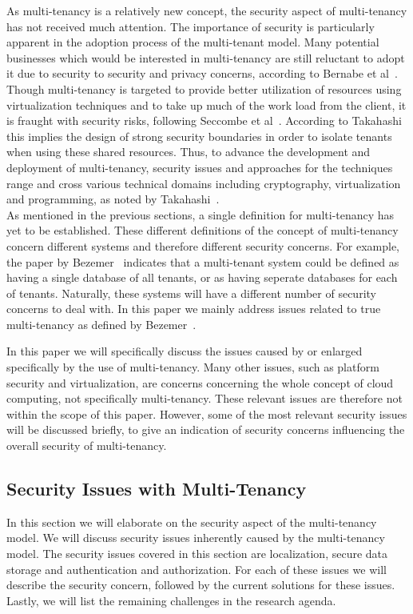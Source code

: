 As multi-tenancy is a relatively new concept, the security aspect of multi-tenancy has not received much attention. The importance of security is particularly apparent in the adoption process of the multi-tenant model. 
Many potential businesses which would be interested in multi-tenancy are still reluctant to adopt it due to security to security and privacy concerns, according to Bernabe et al~\cite{Bernabe2012Auth}. 
Though multi-tenancy is targeted to provide better utilization of resources using virtualization techniques and to take up much of the work load from the client, it is fraught with security risks, following Seccombe et al~\cite{Seccombe2009Security}. 
According to Takahashi~\cite{Takahashi2012Security} this implies the design of strong security boundaries in order to isolate tenants when using these shared resources. 
Thus, to advance the development and deployment of multi-tenancy, security issues and approaches for the techniques range and cross various technical domains including cryptography, virtualization and programming, as noted by Takahashi~\cite{Takahashi2012Security}. \\

As mentioned in the previous sections, a single definition for multi-tenancy has yet to be established. 
These different definitions of the concept of multi-tenancy concern different systems and therefore different security concerns.
For example, the paper by Bezemer~\cite{bezemer2010multi} indicates that a multi-tenant system could be defined as having a single database of all tenants, or as having seperate databases for each of tenants. 
Naturally, these systems will have a different number of security concerns to deal with. In this paper we mainly address issues related to true multi-tenancy as defined by Bezemer~\cite{bezemer2010multi}.

In this paper we will specifically discuss the issues caused by or enlarged specifically by the use of multi-tenancy. 
Many other issues, such as platform security and virtualization, are concerns concerning the whole concept of cloud computing, not specifically multi-tenancy. These relevant issues are therefore not within the scope of this paper. 
However, some of the most relevant security issues will be discussed briefly, to give an indication of security concerns influencing the overall security of multi-tenancy.

\subsection{Security Issues with Multi-Tenancy}
In this section we will elaborate on the security aspect of the multi-tenancy model. 
We will discuss security issues inherently caused by the multi-tenancy model.
The security issues covered in this section are localization, secure data storage and authentication and authorization.
For each of these issues we will describe the security concern, followed by the current solutions for these issues. 
Lastly, we will list the remaining challenges in the research agenda.

